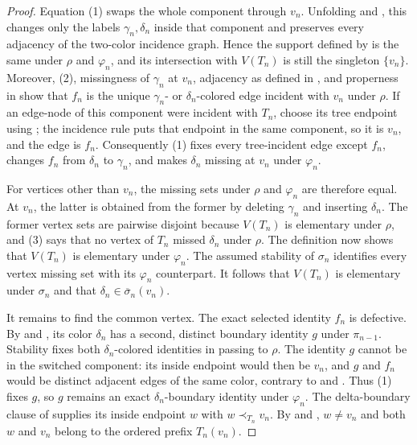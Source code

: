 \begin{proof}
Equation (1) swaps the whole component through $v_n$.  Unfolding
 and
, this changes only the labels
$\gamma_n,\delta_n$ inside that component and preserves every adjacency
of the two-color incidence graph.  Hence the support defined by
 is the same under $\rho$ and $\varphi_n$,
and its intersection with $V(T_n)$ is still the singleton $\{v_n\}$.
Moreover, (2), missingness of $\gamma_n$ at $v_n$, adjacency as defined
in , and properness in
 show that $f_n$ is the unique
$\gamma_n$- or $\delta_n$-colored edge incident with $v_n$ under $\rho$.
If an edge-node of this component were incident with $T_n$, choose its
tree endpoint using ; the incidence rule puts
that endpoint in the same component, so it is $v_n$, and the edge is
$f_n$.  Consequently (1) fixes every tree-incident edge except $f_n$,
changes $f_n$ from $\delta_n$ to $\gamma_n$, and makes $\delta_n$
missing at $v_n$ under $\varphi_n$.

For vertices other than $v_n$, the missing sets under $\rho$ and
$\varphi_n$ are therefore equal.  At $v_n$, the latter is obtained from
the former by deleting $\gamma_n$ and inserting $\delta_n$.  The former
vertex sets are pairwise disjoint because $V(T_n)$ is elementary under
$\rho$, and (3) says that no vertex of $T_n$ missed $\delta_n$ under
$\rho$.  The definition  now shows
that $V(T_n)$ is elementary under $\varphi_n$.  The assumed stability of
$\sigma_n$ identifies every vertex missing set with its
$\varphi_n$ counterpart.  It follows that $V(T_n)$ is elementary under
$\sigma_n$ and that
$\delta_n\in\overline\sigma_n(v_n)$.

It remains to find the common vertex.  The exact selected identity $f_n$
is defective.  By  and
, its color $\delta_n$ has a second, distinct
boundary identity $g$ under $\pi_{n-1}$.  Stability fixes both
$\delta_n$-colored identities in passing to $\rho$.  The identity $g$
cannot be in the switched component: its inside endpoint would then be
$v_n$, and $g$ and $f_n$ would be distinct adjacent edges of the same
color, contrary to  and
.  Thus (1) fixes $g$, so $g$ remains an
exact $\delta_n$-boundary identity under $\varphi_n$.  The delta-boundary
clause of  supplies its inside
endpoint $w$ with $w\prec_{T_n}v_n$.  By
 and ,
$w\ne v_n$ and both $w$ and $v_n$ belong to the ordered prefix
$T_n(v_n)$.


\end{proof}
